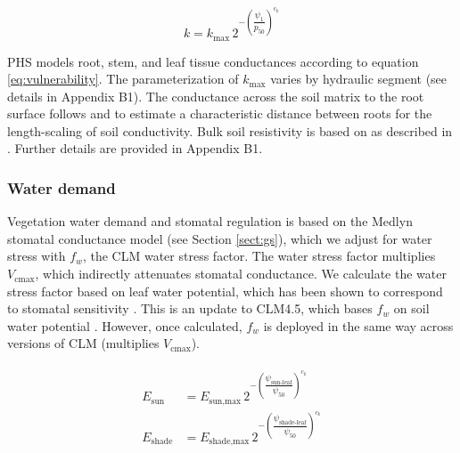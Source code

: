 \documentclass[draft,linenumbers]{agujournal}
\begin{document}
     \begin{linenomath*}
     \begin{equation}
     \label{eq:vulnerability}
     k = k_{\text{max}} \, 2^{-\left(\dfrac{\psi_1}{p_{50}}\right)^{c_k}}
     \end{equation}
     \end{linenomath*}
     
     PHS models root, stem, and leaf tissue conductances according to equation \ref{eq:vulnerability}.
     The parameterization of $k_{\text{max}}$ varies by hydraulic segment (see details in Appendix B1).
     The conductance across the soil matrix to the root surface follows \citet{williams2001} and \citet{bonan2014} 
     to estimate a characteristic distance between roots for the length-scaling of soil conductivity.
     Bulk soil resistivity is based on \citet{clapp1978} as described in \citet{oleson2013}.
     Further details are provided in Appendix B1.
    
    \subsubsection{Water demand}
    \label{sect:demand}
    
    Vegetation water demand and stomatal regulation is based on the Medlyn stomatal conductance model (see Section \ref{sect:gs}), 
    which we adjust for water stress with $f_w$, the CLM water stress factor. 
    The water stress factor multiplies $V_{\text{cmax}}$, which indirectly attenuates stomatal conductance.
    We calculate the water stress factor based on leaf water potential, which has been shown to correspond to stomatal sensitivity \citep{klein2014}.
    This is an update to CLM4.5, which bases $f_w$ on soil water potential \citep{oleson2013}.
    However, once calculated, $f_w$ is deployed in the same way across versions of CLM (multiplies $V_{\text{cmax}}$).

     \begin{linenomath*}
     \begin{eqnarray}
     \begin{aligned}
     \label{eq:demand}
     E_{\text{sun}}     &= E_{\text{sun,max}} \, 2^{-\left(\dfrac{\psi_{\text{sun-leaf}}}{\psi_{50}}\right)^{c_k}} \\
     E_{\text{shade}} &= E_{\text{shade,max}} \, 2^{-\left(\dfrac{\psi_{\text{shade-leaf}}}{\psi_{50}}\right)^{c_k}}
     \end{aligned}
     \end{eqnarray}
     \end{linenomath*}
    
\end{document}
